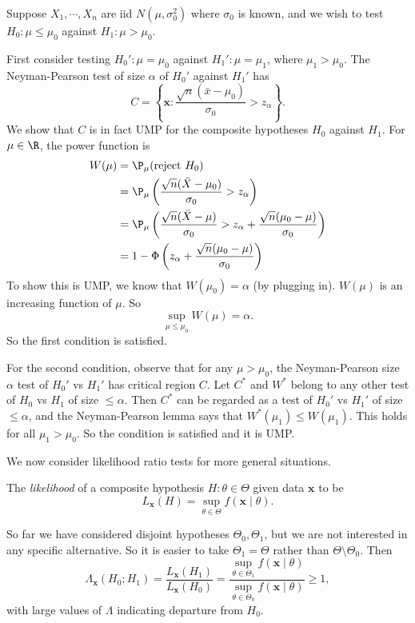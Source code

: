 \documentclass[a4paper]{article}
\begin{document}
\begin{eg}
  Suppose $X_1, \cdots, X_n$ are iid $N(\mu, \sigma_0^2)$ where $\sigma_0$ is known, and we wish to test $H_0: \mu\leq \mu_0$ against $H_1: \mu > \mu_0$.

  First consider testing $H_0': \mu = \mu_0$ against $H_1': \mu = \mu_1$, where $\mu_1 > \mu_0$. The Neyman-Pearson test of size $\alpha$ of $H_0'$ against $H_1'$ has
  \[
    C = \left\{\mathbf{x}: \frac{\sqrt{n}(\bar x - \mu_0)}{\sigma_0} > z_\alpha\right\}.
  \]
  We show that $C$ is in fact UMP for the composite hypotheses $H_0$ against $H_1$. For $\mu\in \R$, the power function is
  \begin{align*}
    W(\mu) &= \P_\mu(\text{reject } H_0)\\
    &= \P_\mu\left(\frac{\sqrt{n}(\bar X - \mu_0)}{\sigma_0} > z_\alpha\right)\\
    &= \P_\mu\left(\frac{\sqrt{n}(\bar X - \mu)}{\sigma_0} > z_\alpha + \frac{\sqrt{n}(\mu_0 - \mu)}{\sigma_0}\right)\\
    &= 1 - \Phi\left(z_\alpha + \frac{\sqrt{n}(\mu_0 - \mu)}{\sigma_0}\right)
  \end{align*}
  To show this is UMP, we know that $W(\mu_0) = \alpha$ (by plugging in). $W(\mu)$ is an increasing function of $\mu$. So
  \[
    \sup_{ \mu \leq \mu_0} W(\mu) = \alpha.
  \]
  So the first condition is satisfied.

  For the second condition, observe that for any $\mu > \mu_0$, the Neyman-Pearson size $\alpha$ test of $H_0'$ vs $H_1'$ has critical region $C$. Let $C^*$ and $W^*$ belong to any other test of $H_0$ vs $H_1$ of size $\leq \alpha$. Then $C^*$ can be regarded as a test of $H_0'$ vs $H_1'$ of size $\leq \alpha$, and the Neyman-Pearson lemma says that $W^*(\mu_1) \leq W(\mu_1)$. This holds for all $\mu_1 > \mu_0$. So the condition is satisfied and it is UMP.
\end{eg}
We now consider likelihood ratio tests for more general situations.
\begin{defi}
  The \emph{likelihood} of a composite hypothesis $H:\theta\in \Theta$ given data $\mathbf{x}$ to be
  \[
    L_{\mathbf{x}}(H) = \sup_{\theta\in \Theta}f(\mathbf{x}\mid \theta).
  \]
\end{defi}
So far we have considered disjoint hypotheses $\Theta_0, \Theta_1$, but we are not interested in any specific alternative. So it is easier to take $\Theta_1 = \Theta$ rather than $\Theta \setminus\Theta_0$. Then
\[
  \Lambda_\mathbf{x} (H_0; H_1) = \frac{L_\mathbf{x}(H_1)}{L_\mathbf{x}(H_0)}=\frac{\sup_{\theta\in \Theta_1}f(\mathbf{x}\mid \theta)}{\sup_{\theta\in \Theta_0}f(\mathbf{x}\mid \theta)} \geq 1,
\]
with large values of $\Lambda$ indicating departure from $H_0$.
\end{document}
